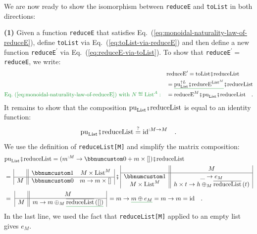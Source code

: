 We are now ready to show the isomorphism between \lstinline!reduceE!
and \lstinline!toList! in both directions:

\textbf{(1)} Given a function \lstinline!reduceE! that satisfies
Eq.~(\ref{eq:monoidal-naturality-law-of-reduceE}), define \lstinline!toList!
via Eq.~(\ref{eq:toList-via-reduceE}) and then define a new function
\lstinline!reduceE!$^{\prime}$ via Eq.~(\ref{eq:reduceE-via-toList}).
To show that \lstinline!reduceE!$^{\prime}=$ \lstinline!reduceE!,
we write:
\begin{align*}
 & \text{reduceE}^{\prime}=\text{toList}\bef\text{reduceList}\\
 & =\gunderline{\text{pu}_{\text{List}}^{\uparrow L}\bef\text{reduceE}^{\text{List}^{M}}}\bef\text{reduceList}\\
{\color{greenunder}\text{Eq.~(\ref{eq:monoidal-naturality-law-of-reduceE}) with }N\triangleq\text{List}^{A}:}\quad & =\text{reduceE}^{M}\bef\text{pu}_{\text{List}}\bef\text{reduceList}\quad.
\end{align*}
It remains to show that the composition $\text{pu}_{\text{List}}\bef\text{reduceList}$
is equal to an identity function:
\[
\text{pu}_{\text{List}}\bef\text{reduceList}\overset{?}{=}\text{id}^{:M\rightarrow M}\quad.
\]
We use the definition of \lstinline!reduceList[M]! and simplify the
matrix composition:
\begin{align*}
 & \text{pu}_{\text{List}}\bef\text{reduceList}=(m^{:M}\rightarrow\bbnum 0+m\times\left[\right])\bef\text{reduceList}\\
 & =\,\begin{array}{|c||cc|}
 & \bbnum 1 & M\times\text{List}^{M}\\
\hline M & \bbnum 0 & m\rightarrow m\times\left[\right]
\end{array}\,\bef\,\begin{array}{|c||c|}
 & M\\
\hline \bbnum 1 & \_\rightarrow e_{M}\\
M\times\text{List}^{M} & h\times t\rightarrow h\oplus_{M}\overline{\text{reduceList}}\left(t\right)
\end{array}\\
 & =\,\,\begin{array}{|c||c|}
 & M\\
\hline M & m\rightarrow m\oplus_{M}\gunderline{\overline{\text{reduceList}}\left(\left[\right]\right)}
\end{array}\,=m\rightarrow\gunderline{m\oplus e_{M}}=m\rightarrow m=\text{id}\quad.
\end{align*}
In the last line, we used the fact that \lstinline!reduceList[M]!
applied to an empty list gives $e_{M}$.

